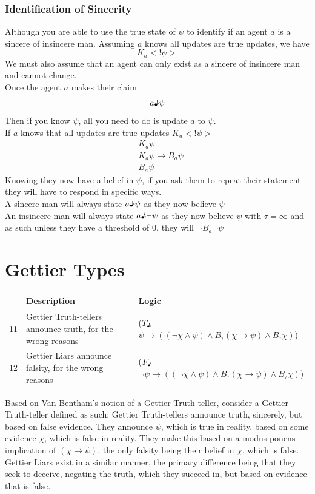 \documentclass[12pt, titlepage, twoside]{report}
\newcommand{\true}{$T_\text{\textmusicalnote}$}
\newcommand{\false}{$F_\text{\textmusicalnote}$}
\begin{document}
\subsection{Identification of Sincerity}
Although you are able to use the true state of $\psi$ to identify if an agent $a$ is a sincere of insincere man. Assuming $a$ knows all updates are true updates, we have $$K_a<!\psi >$$
We must also assume that an agent can only exist as a sincere of insincere man and cannot change.\\
Once the agent $a$ makes their claim 
$$a\text{\textmusicalnote} \psi$$
Then if you know $\psi$, all you need to do is update $a$ to $\psi$.\\
If $a$ knows that all updates are true updates $K_a<!\psi >$
\begin{align*}
&K_a \psi\\
&K_a \psi \to B_a \psi\\
&B_a \psi
\end{align*}
Knowing they now have a belief in $\psi$, if you ask them to repeat their statement they will have to respond in specific ways.\\
A sincere man will always state $a\text{\textmusicalnote} \psi$ as they now believe $\psi$\\
An insincere man will always state $a\text{\textmusicalnote} \neg \psi$ as they now believe $\psi$ with $\tau = \infty$ and as such unless they have a threshold of $0$, they will $\neg B_a \neg \psi$

\chapter{Gettier Types}
\begin{table}[h]
\begin{tabular}{lp{6cm}p{8cm}}
\hline
   & Description                                                 & Logic                                                                                                               \\ \hline
11 & Gettier Truth-tellers announce truth, for the wrong reasons & (\true$\psi \to ((\neg \chi \wedge \psi ) \wedge B_\tau (\chi \to \psi ) \wedge B_\tau \chi)$)       \\
12 & Gettier Liars announce falsity, for the wrong reasons       & (\false$\neg \psi \to ((\neg \chi \wedge \psi ) \wedge B_\tau (\chi \to \psi ) \wedge B_\tau \chi)$) \\ \hline
\end{tabular}
\end{table}
Based on Van Bentham's notion of a Gettier Truth-teller\autocite{BenthemJohanvan2010Mlfo}, consider a Gettier Truth-teller defined as such; Gettier Truth-tellers announce truth, sincerely, but based on false evidence. They announce $\psi$, which is true in reality, based on some evidence $\chi$, which is false in reality. They make this based on a modus ponens implication of $(\chi \to \psi)$, the only falsity being their belief in $\chi$, which is false.\\
Gettier Liars exist in a similar manner, the primary difference being that they seek to deceive, negating the truth, which they succeed in, but based on evidence that is false.
\end{document}
